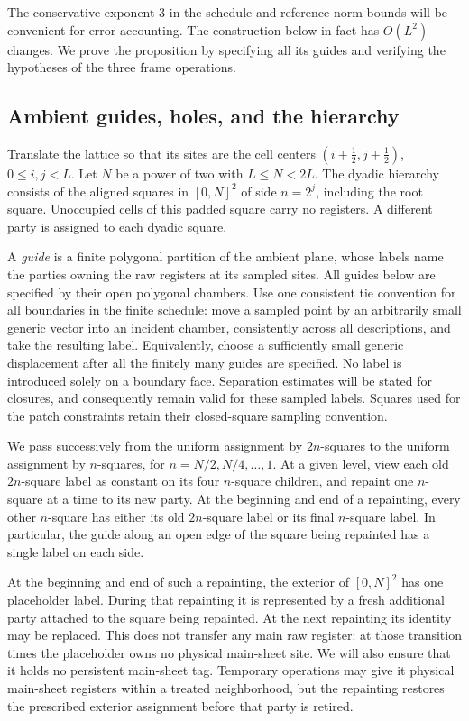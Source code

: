 The conservative exponent $3$ in the schedule and reference-norm bounds
will be convenient for error accounting.  The construction below in fact
has $O(L^2)$ changes.  We prove the proposition by specifying all its
guides and verifying the hypotheses of the three frame operations.

\subsection{Ambient guides, holes, and the hierarchy}

Translate the lattice so that its sites are the cell centers
$(i+\tfrac12,j+\tfrac12)$, $0\le i,j<L$.  Let $N$ be a power of two
with $L\le N<2L$.  The dyadic hierarchy consists of the aligned squares
in $[0,N]^2$ of side $n=2^j$, including the root square.  Unoccupied
cells of this padded square carry no registers.  A different party is
assigned to each dyadic square.

A \emph{guide} is a finite polygonal partition of the ambient plane,
whose labels name the parties owning the raw registers at its sampled
sites.  All guides below are specified by their open polygonal chambers.
Use one consistent tie convention for all boundaries in the finite
schedule: move a sampled point by an arbitrarily small generic vector
into an incident chamber, consistently across all descriptions, and
take the resulting label.  Equivalently, choose a sufficiently small
generic displacement after all the finitely many guides are specified.
No label is introduced solely on a boundary face.  Separation estimates
will be stated for closures, and consequently remain valid for these
sampled labels.  Squares used for the patch constraints retain their
closed-square sampling convention.

We pass successively from the uniform assignment by $2n$-squares to the
uniform assignment by $n$-squares, for
$n=N/2,N/4,\ldots,1$.  At a given level, view each old $2n$-square
label as constant on its four $n$-square children, and repaint one
$n$-square at a time to its new party.  At the beginning and end of a
repainting, every other $n$-square has either its old $2n$-square label
or its final $n$-square label.  In particular, the guide along an open
edge of the square being repainted has a single label on each side.

At the beginning and end of such a repainting, the exterior of
$[0,N]^2$ has one placeholder label.  During that repainting it is
represented by a fresh additional party attached to the square being
repainted.  At the next repainting its identity may be replaced.  This
does not transfer any main raw register: at those transition times the
placeholder owns no physical main-sheet site.  We will also ensure that
it holds no persistent main-sheet tag.  Temporary operations may give
it physical main-sheet registers within a treated neighborhood, but the
repainting restores the prescribed exterior assignment before that party
is retired.

